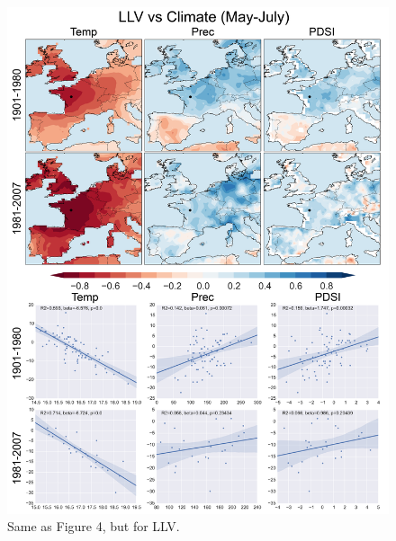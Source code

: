 \documentclass[12pt]{article}
\begin{document}
\begin{figure}
\center
\includegraphics[width=.9\columnwidth,scale=2]{SUPP_fig_09_LLV_MJJ_climate_onedeg_withtrend.png}
\caption{Same as Figure 4, but for LLV.}
\end{figure}
\end{document}
